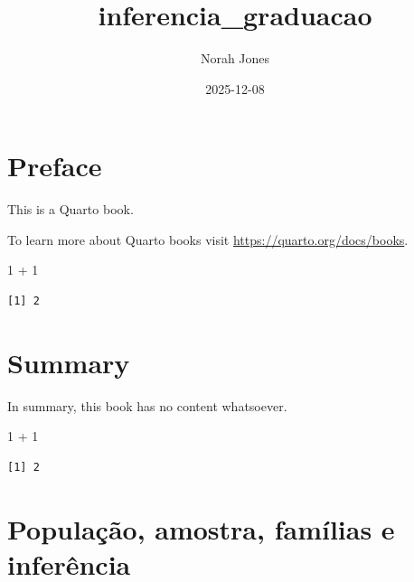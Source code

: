 \documentclass[
  letterpaper,
  DIV=11,
  numbers=noendperiod]{scrreprt}
\title{inferencia\_graduacao}
\author{Norah Jones}
\date{2025-12-08}
\newenvironment{Shaded}{\begin{snugshade}}{\end{snugshade}}
\newcommand{\DecValTok}[1]{\textcolor[rgb]{0.68,0.00,0.00}{#1}}
\newcommand{\SpecialCharTok}[1]{\textcolor[rgb]{0.37,0.37,0.37}{#1}}
\renewcommand*\contentsname{Table of contents}
\newcommand\contentsname{Table of contents}
\begin{document}
\maketitle

\renewcommand*\contentsname{Table of contents}
{
\hypersetup{linkcolor=}
\setcounter{tocdepth}{2}
\tableofcontents
}

\chapter*{Preface}\label{preface}


This is a Quarto book.

To learn more about Quarto books visit
\url{https://quarto.org/docs/books}.

\begin{Shaded}
\begin{Highlighting}[]
\DecValTok{1} \SpecialCharTok{+} \DecValTok{1}
\end{Highlighting}
\end{Shaded}

\begin{verbatim}
[1] 2
\end{verbatim}


\chapter{Summary}\label{summary}

In summary, this book has no content whatsoever.

\begin{Shaded}
\begin{Highlighting}[]
\DecValTok{1} \SpecialCharTok{+} \DecValTok{1}
\end{Highlighting}
\end{Shaded}

\begin{verbatim}
[1] 2
\end{verbatim}


\chapter{População, amostra, famílias e
inferência}\label{populauxe7uxe3o-amostra-famuxedlias-e-inferuxeancia}
\end{document}
